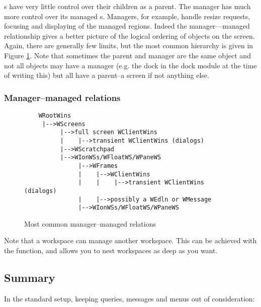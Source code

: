 s have very little control over their children as a parent.
The manager  has much more control over its
managed s. Managers, for example, handle resize requests,
focusing and displaying of the managed regions. Indeed the manager---managed
relationship gives a better picture of the logical ordering of objects on
the screen. Again, there are generally few limits, but the most common
hierarchy is given in Figure \ref{fig:managership}. Note that sometimes
the parent and manager are the same object and not all objects may have
a manager (e.g. the dock in the dock module at the time of writing this)
but all have a parent--a screen if not anything else.

\subsubsection{Manager--managed relations}

\begin{figure}
\begin{htmlonly}
\docode %
\end{htmlonly}
\begin{verbatim}
    WRootWins
     |-->WScreens
          |-->full screen WClientWins
          |    |-->transient WClientWins (dialogs)
          |-->WScratchpad
          |-->WIonWSs/WFloatWS/WPaneWS
               |-->WFrames
               |    |-->WClientWins
               |    |    |-->transient WClientWins (dialogs)
               |    |-->possibly a WEdln or WMessage
               |-->WIonWSs/WFloatWS/WPaneWS
\end{verbatim}
\caption{Most common manager--managed relations}
\label{fig:managership}
\end{figure}

Note that a workspace can manage another workspace. This can be
achieved with the  function, and allows you to nest
workspaces as deep as you want.


\subsection{Summary}

In the standard setup, keeping queries, messages and menus out of
consideration:

